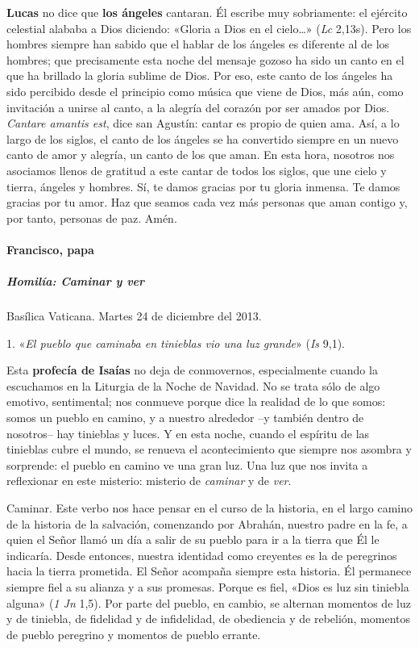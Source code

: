 \documentclass[]{article}
\let\oldparagraph\paragraph
\renewcommand{\paragraph}[1]{\oldparagraph{#1}\mbox{}}
\let\oldsubparagraph\subparagraph
\renewcommand{\subparagraph}[1]{\oldsubparagraph{#1}\mbox{}}
\begin{document}
\textbf{Lucas} no dice que \textbf{los ángeles} cantaran. Él escribe muy
sobriamente: el ejército celestial alababa a Dios diciendo: «Gloria a
Dios en el cielo\ldots{}» (\emph{Lc} 2,13s). Pero los hombres siempre
han sabido que el hablar de los ángeles es diferente al de los hombres;
que precisamente esta noche del mensaje gozoso ha sido un canto en el
que ha brillado la gloria sublime de Dios. Por eso, este canto de los
ángeles ha sido percibido desde el principio como música que viene de
Dios, más aún, como invitación a unirse al canto, a la alegría del
corazón por ser amados por Dios. \emph{Cantare amantis est}, dice san
Agustín: cantar es propio de quien ama\emph{.} Así, a lo largo de los
siglos, el canto de los ángeles se ha convertido siempre en un nuevo
canto de amor y alegría, un canto de los que aman. En esta hora,
nosotros nos asociamos llenos de gratitud a este cantar de todos los
siglos, que une cielo y tierra, ángeles y hombres. Sí, te damos gracias
por tu gloria inmensa. Te damos gracias por tu amor. Haz que seamos cada
vez más personas que aman contigo y, por tanto, personas de paz. Amén.

\paragraph{Francisco, papa}\label{francisco-papa-4}

\subparagraph{Homilía: Caminar y ver}\label{homiluxeda-caminar-y-ver}

Basílica Vaticana. Martes 24 de diciembre del 2013.

1. «\emph{El pueblo que caminaba en tinieblas vio una luz grande}»
(\emph{Is} 9,1).

Esta \textbf{profecía de Isaías} no deja de conmovernos, especialmente
cuando la escuchamos en la Liturgia de la Noche de Navidad. No se trata
sólo de algo emotivo, sentimental; nos conmueve porque dice la realidad
de lo que somos: somos un pueblo en camino, y a nuestro alrededor --y
también dentro de nosotros-- hay tinieblas y luces. Y en esta noche,
cuando el espíritu de las tinieblas cubre el mundo, se renueva el
acontecimiento que siempre nos asombra y sorprende: el pueblo en camino
ve una gran luz. Una luz que nos invita a reflexionar en este misterio:
misterio de \emph{caminar} y de \emph{ver}.

Caminar. Este verbo nos hace pensar en el curso de la historia, en el
largo camino de la historia de la salvación, comenzando por Abrahán,
nuestro padre en la fe, a quien el Señor llamó un día a salir de su
pueblo para ir a la tierra que Él le indicaría. Desde entonces, nuestra
identidad como creyentes es la de peregrinos hacia la tierra prometida.
El Señor acompaña siempre esta historia. Él permanece siempre fiel a su
alianza y a sus promesas. Porque es fiel, «Dios es luz sin tiniebla
alguna» (\emph{1 Jn} 1,5). Por parte del pueblo, en cambio, se alternan
momentos de luz y de tiniebla, de fidelidad y de infidelidad, de
obediencia y de rebelión, momentos de pueblo peregrino y momentos de
pueblo errante.
\end{document}
